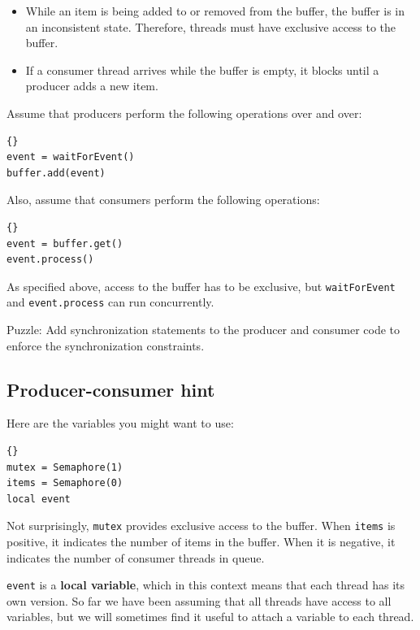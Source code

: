 \documentclass{book}
\begin{document}
\begin{itemize}

    \item While an item is being added to or removed from the buffer,
          the buffer is in an inconsistent state.  Therefore, threads must
          have exclusive access to the buffer.

    \item If a consumer thread arrives while the buffer is empty, it
          blocks until a producer adds a new item.

\end{itemize}

Assume that producers perform the following operations over and
over:

\begin{lstlisting}[title={Basic producer code}]{}
event = waitForEvent()
buffer.add(event)
\end{lstlisting}

Also, assume that consumers perform the following operations:

\begin{lstlisting}[title={Basic consumer code}]{}
event = buffer.get()
event.process()
\end{lstlisting}

As specified above, access to the buffer has to be exclusive,
but {\tt waitForEvent} and {\tt event.process}
can run concurrently.

Puzzle: Add synchronization statements to the producer and
consumer code to enforce the synchronization constraints.


\subsection{Producer-consumer hint}

Here are the variables you might want to use:

\begin{lstlisting}[title={Producer-consumer initialization}]{}
mutex = Semaphore(1)
items = Semaphore(0)
local event
\end{lstlisting}

Not surprisingly, {\tt mutex} provides exclusive access to
the buffer.  When {\tt items} is positive, it indicates the
number of items in the buffer.  When it is negative, it
indicates the number of consumer threads in queue.

    {\tt event} is a {\bf local variable}, which in this context means
that each thread has its own version.
So far we have been assuming that all threads have access
to all variables, but we will sometimes find it useful to
attach a variable to each thread.
\end{document}
